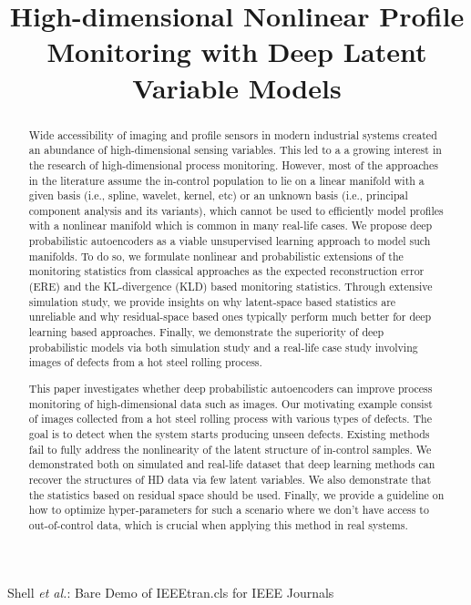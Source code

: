 \documentclass[journal, peerreview]{IEEEtran}
\begin{document}
\title{High-dimensional Nonlinear Profile Monitoring with Deep Latent Variable Models}

\ifCLASSOPTIONpeerreview

\else
	{Shell \MakeLowercase{\textit{et al.}}: Bare Demo of IEEEtran.cls for IEEE Journals}
\fi

\maketitle

\begin{abstract}
	Wide accessibility of imaging and profile sensors in modern industrial systems created an abundance of high-dimensional sensing variables. This led to a a growing interest in the research of high-dimensional process monitoring. However, most of the approaches in the literature assume the in-control population to lie on a linear manifold with a given basis (i.e., spline, wavelet, kernel, etc) or an unknown basis (i.e., principal component analysis and its variants), which cannot be used to efficiently model profiles with a nonlinear manifold which is common in many real-life cases. We propose deep probabilistic autoencoders as a viable unsupervised learning approach to model such manifolds. To do so, we formulate nonlinear and probabilistic extensions of the monitoring statistics from classical approaches as the expected reconstruction error (ERE) and the KL-divergence (KLD) based monitoring statistics. Through extensive simulation study, we provide insights on why latent-space based statistics are unreliable and why residual-space based ones typically perform much better for deep learning based approaches. Finally, we demonstrate the superiority of deep probabilistic models via both simulation study and a real-life case study involving images of defects from a hot steel rolling process.
\end{abstract}


\def\abstractname{Note to Practitioners}
\begin{abstract}
	This paper investigates whether deep probabilistic autoencoders can improve process monitoring of high-dimensional data such as images. Our motivating example consist of images collected from a hot steel rolling process with various types of defects. The goal is to detect when the system starts producing unseen defects. Existing methods fail to fully address the nonlinearity of the latent structure of in-control samples. We demonstrated both on simulated and real-life dataset that deep learning methods can recover the structures of HD data via few latent variables. We also demonstrate that the statistics based on residual space should be used. Finally, we provide a guideline on how to optimize hyper-parameters for such a scenario where we don't have access to out-of-control data, which is crucial when applying this method in real systems.
\end{abstract}
\end{document}
